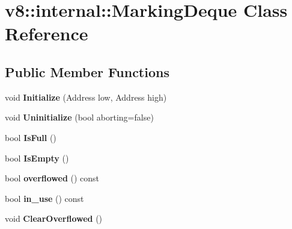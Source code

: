 \hypertarget{classv8_1_1internal_1_1_marking_deque}{}\section{v8\+:\+:internal\+:\+:Marking\+Deque Class Reference}
\label{classv8_1_1internal_1_1_marking_deque}
\subsection*{Public Member Functions}
\begin{DoxyCompactItemize}
\item 
void {\bfseries Initialize} (Address low, Address high)\hypertarget{classv8_1_1internal_1_1_marking_deque_af5d7193fa995621fb0b9f4f2549cc298}{}\label{classv8_1_1internal_1_1_marking_deque_af5d7193fa995621fb0b9f4f2549cc298}

\item 
void {\bfseries Uninitialize} (bool aborting=false)\hypertarget{classv8_1_1internal_1_1_marking_deque_aaf0497b6db1a8eb3efaa9396169ffce9}{}\label{classv8_1_1internal_1_1_marking_deque_aaf0497b6db1a8eb3efaa9396169ffce9}

\item 
bool {\bfseries Is\+Full} ()\hypertarget{classv8_1_1internal_1_1_marking_deque_ab5e1a83987a1c90e8825edd088b347ba}{}\label{classv8_1_1internal_1_1_marking_deque_ab5e1a83987a1c90e8825edd088b347ba}

\item 
bool {\bfseries Is\+Empty} ()\hypertarget{classv8_1_1internal_1_1_marking_deque_a3db4c132717260d8f1bb00f84dec60c4}{}\label{classv8_1_1internal_1_1_marking_deque_a3db4c132717260d8f1bb00f84dec60c4}

\item 
bool {\bfseries overflowed} () const \hypertarget{classv8_1_1internal_1_1_marking_deque_aed9511b7f9a72c37952c78a43186b7ab}{}\label{classv8_1_1internal_1_1_marking_deque_aed9511b7f9a72c37952c78a43186b7ab}

\item 
bool {\bfseries in\+\_\+use} () const \hypertarget{classv8_1_1internal_1_1_marking_deque_a96a7c334d2f44c26b6f961047adfbe58}{}\label{classv8_1_1internal_1_1_marking_deque_a96a7c334d2f44c26b6f961047adfbe58}

\item 
void {\bfseries Clear\+Overflowed} ()\hypertarget{classv8_1_1internal_1_1_marking_deque_a8eb2c854d43bd1640aabeae46782213f}{}\label{classv8_1_1internal_1_1_marking_deque_a8eb2c854d43bd1640aabeae46782213f}


\end{DoxyCompactItemize}
